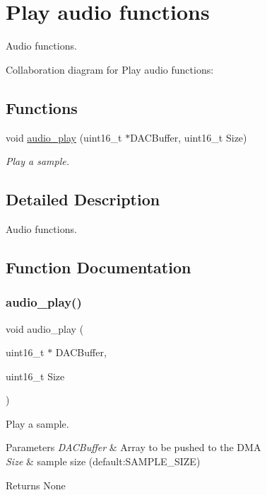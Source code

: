 \hypertarget{group___audio___play}{}\section{Play audio functions}
\label{group___audio___play}


Audio functions.  


Collaboration diagram for Play audio functions\+:
\subsection*{Functions}
\begin{DoxyCompactItemize}
\item 
void \hyperlink{group___audio___play_gaf73a37418a80bbb39f75abe8b60b0afb}{audio\+\_\+play} (uint16\+\_\+t $\ast$D\+A\+C\+Buffer, uint16\+\_\+t Size)
\begin{DoxyCompactList}\small\item\em Play a sample. \end{DoxyCompactList}\end{DoxyCompactItemize}


\subsection{Detailed Description}
Audio functions. 



\subsection{Function Documentation}
\mbox{\label{group___audio___play_gaf73a37418a80bbb39f75abe8b60b0afb}} 
\subsubsection{\texorpdfstring{audio\+\_\+play()}{audio\_play()}}
{\footnotesize\ttfamily void audio\+\_\+play (\begin{DoxyParamCaption}\item[{uint16\+\_\+t $\ast$}]{D\+A\+C\+Buffer,  }\item[{uint16\+\_\+t}]{Size }\end{DoxyParamCaption})}



Play a sample. 


\begin{DoxyParams}{Parameters}
{\em D\+A\+C\+Buffer} & Array to be pushed to the D\+MA \\
\hline
{\em Size} & sample size (default\+:S\+A\+M\+P\+L\+E\+\_\+\+S\+I\+ZE) \\
\hline
\end{DoxyParams}
\begin{DoxyReturn}{Returns}
None 
\end{DoxyReturn}
